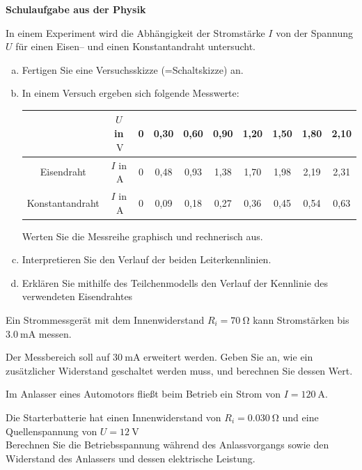 \documentclass[a4paper]{article}
\begin{document}
{\bf Schulaufgabe aus der Physik }\\
\begin{enumerate}[1.]

{\bf \item In einem Experiment wird die Abhängigkeit der Stromstärke $I$ von der Spannung $U$ für einen Eisen-- und einen Konstantandraht untersucht.}

\begin{enumerate}[a)]
\item Fertigen Sie eine Versuchsskizze (=Schaltskizze) an.
\item In einem Versuch ergeben sich folgende Messwerte:

\hspace{15 pt}

\begin{tabular}{c|c|c|c|c|c|c|c|c|c}
                             & $U$ in $\SI{}{\volt}$ & 0 & 0,30 & 0,60 & 0,90 & 1,20 & 1,50 & 1,80 & 2,10 \\
\hline
Eisendraht            & $I$ in $\SI{}{\ampere}$ & 0 & 0,48 & 0,93 & 1,38 & 1,70 & 1,98 & 2,19 & 2,31 \\
Konstantandraht  & $I$ in $\SI{}{\ampere}$ & 0 & 0,09 & 0,18 & 0,27 & 0,36 & 0,45 & 0,54 & 0,63 
\end{tabular}

\hspace{15 pt}

 Werten Sie die Messreihe graphisch und rechnerisch aus.
\item Interpretieren Sie den Verlauf der beiden Leiterkennlinien.
\item Erklären Sie mithilfe des Teilchenmodells den Verlauf der Kennlinie des verwendeten Eisendrahtes
\end{enumerate}

{\bf \item Ein Strommessgerät mit dem Innenwiderstand $R_i=\SI{70}{\ohm}$ kann Stromstärken bis 
$\SI{3,0}{\milli\ampere}$ messen.} Der Messbereich soll auf $\SI{30}{\milli\ampere}$ erweitert werden. Geben Sie an, wie ein zusätzlicher Widerstand geschaltet werden muss, und berechnen Sie dessen Wert.

{\bf \item Im Anlasser eines Automotors fließt beim Betrieb ein Strom von $I=\SI{120}{\ampere}$.} Die Starterbatterie hat einen Innenwiderstand von $R_i=\SI{0,030}{\ohm}$ und eine Quellenspannung von $U=\SI{12}{\volt}$\\
Berechnen Sie die Betriebsspannung während des Anlassvorgangs sowie den Widerstand  des Anlassers und dessen elektrische Leistung.


\end{enumerate}
\end{document}
